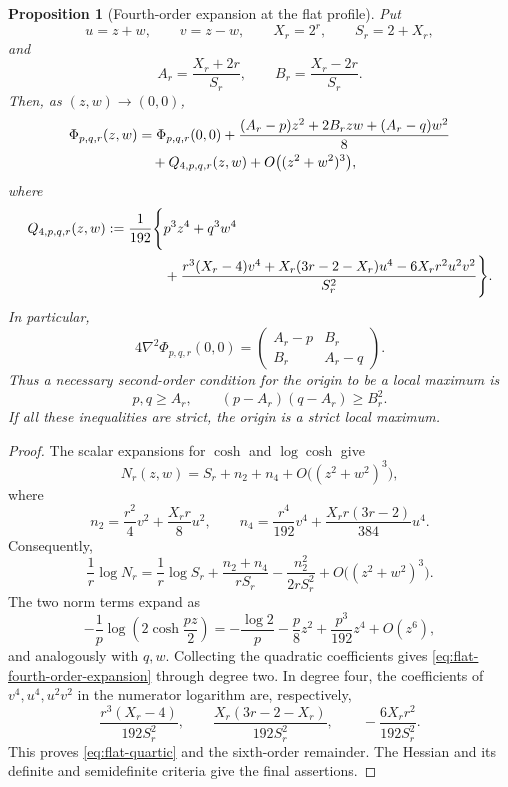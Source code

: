 \documentclass[11pt,reqno]{amsart}
\numberwithin{equation}{section}
\newtheorem{proposition}[proposition]{Proposition}
\theoremstyle{definition}
\theoremstyle{remark}
\begin{document}
\begin{proposition}[Fourth-order expansion at the flat profile]
\label{prop:flat-taylor}
Put
\[
  u=z+w,\qquad v=z-w,\qquad X_r=2^r,\qquad S_r=2+X_r,
\]
and
\begin{equation}\label{eq:AB-def}
  A_r=\frac{X_r+2r}{S_r},
  \qquad
  B_r=\frac{X_r-2r}{S_r}.
\end{equation}
Then, as $(z,w)\to(0,0)$,
\begin{align}\label{eq:flat-fourth-order-expansion}
  \Phi_{p,q,r}(z,w)
  &=\Phi_{p,q,r}(0,0)
  +\frac{(A_r-p)z^2+2B_rzw+(A_r-q)w^2}{8}\notag\\
  &\quad+Q_{4,p,q,r}(z,w)
  +O\bigl((z^2+w^2)^3\bigr),
\end{align}
where
\begin{align}\label{eq:flat-quartic}
  Q_{4,p,q,r}(z,w)
  :=\frac1{192}\Bigg\{&
  p^3z^4+q^3w^4 \notag\\
  &+\frac{
  r^3(X_r-4)v^4
  +X_r(3r-2-X_r)u^4
  -6X_rr^2u^2v^2}{S_r^2}
  \Bigg\}.
\end{align}
In particular,
\begin{equation}\label{eq:flat-hessian}
  4\nabla^2\Phi_{p,q,r}(0,0)
  =
  \begin{pmatrix}
    A_r-p&B_r\\
    B_r&A_r-q
  \end{pmatrix}.
\end{equation}
Thus a necessary second-order condition for the origin to be a local maximum is
\begin{equation}\label{eq:flat-stability}
  p,q\ge A_r,
  \qquad
  (p-A_r)(q-A_r)\ge B_r^2.
\end{equation}
If all these inequalities are strict, the origin is a strict local maximum.
\end{proposition}

\begin{proof}
The scalar expansions for $\cosh$ and $\log\cosh$ give
\[
  N_r(z,w)
  =S_r+n_2+n_4+O\bigl((z^2+w^2)^3\bigr),
\]
where
\[
  n_2=\frac{r^2}{4}v^2+\frac{X_rr}{8}u^2,
  \qquad
  n_4=\frac{r^4}{192}v^4+\frac{X_rr(3r-2)}{384}u^4.
\]
Consequently,
\[
  \frac1r\log N_r
  =\frac1r\log S_r+\frac{n_2+n_4}{rS_r}
  -\frac{n_2^2}{2rS_r^2}
  +O\bigl((z^2+w^2)^3\bigr).
\]
The two norm terms expand as
\[
  -\frac1p\log\left(2\cosh\frac{pz}{2}\right)
  =-\frac{\log2}{p}-\frac p8z^2+\frac{p^3}{192}z^4+O(z^6),
\]
and analogously with $q,w$.  Collecting the quadratic coefficients gives
\eqref{eq:flat-fourth-order-expansion} through degree two.  In degree four,
the coefficients of $v^4,u^4,u^2v^2$ in the numerator logarithm are,
respectively,
\[
  \frac{r^3(X_r-4)}{192S_r^2},\qquad
  \frac{X_r(3r-2-X_r)}{192S_r^2},\qquad
  -\frac{6X_rr^2}{192S_r^2}.
\]
This proves \eqref{eq:flat-quartic} and the sixth-order remainder.  The Hessian
and its definite and semidefinite criteria give the final assertions.
\end{proof}
\end{document}
